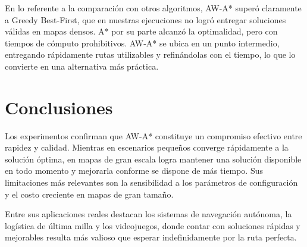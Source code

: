 \documentclass[12pt,a4paper]{article}
\begin{document}
\begin{table}[H]
    \centering
    \caption{Resultados en mapas grandes: tasa de éxito, longitudes promedio y métricas de tiempos.}
    \label{tab:mapas_grandes_full}
\end{table}

En lo referente a la comparación con otros algoritmos, AW-A* superó claramente a Greedy Best-First, que en nuestras ejecuciones no logró entregar soluciones válidas en mapas densos. A* por su parte alcanzó la optimalidad, pero con tiempos de cómputo prohibitivos. AW-A* se ubica en un punto intermedio, entregando rápidamente rutas utilizables y refinándolas con el tiempo, lo que lo convierte en una alternativa más práctica.

\section{Conclusiones}
Los experimentos confirman que AW-A* constituye un compromiso efectivo entre rapidez y calidad. Mientras en escenarios pequeños converge rápidamente a la solución óptima, en mapas de gran escala logra mantener una solución disponible en todo momento y mejorarla conforme se dispone de más tiempo. Sus limitaciones más relevantes son la sensibilidad a los parámetros de configuración y el costo creciente en mapas de gran tamaño.  

Entre sus aplicaciones reales destacan los sistemas de navegación autónoma, la logística de última milla y los videojuegos, donde contar con soluciones rápidas y mejorables resulta más valioso que esperar indefinidamente por la ruta perfecta.
\end{document}
